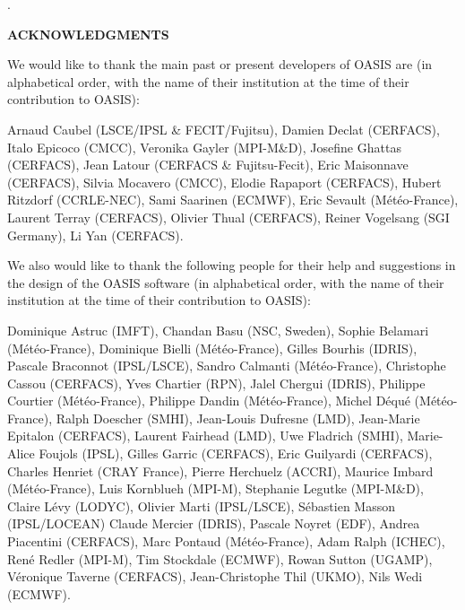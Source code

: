 \newpage
%
.

\vspace{3cm}

{\bf ACKNOWLEDGMENTS}
 
\vspace{1.5cm}
 We would like to thank the main past or present developers of OASIS
are (in alphabetical order, with the name of their institution at the time of their contribution to OASIS):

Arnaud Caubel (LSCE/IPSL \& FECIT/Fujitsu),
Damien Declat (CERFACS),
Italo Epicoco (CMCC),
Veronika Gayler (MPI-M\&D),
Josefine Ghattas (CERFACS),
Jean Latour (CERFACS \& Fujitsu-Fecit),
Eric Maisonnave (CERFACS),
Silvia Mocavero (CMCC),
Elodie Rapaport (CERFACS),
Hubert Ritzdorf (CCRLE-NEC),
Sami Saarinen (ECMWF),
Eric Sevault (M\'et\'eo-France),
Laurent Terray (CERFACS),
Olivier Thual (CERFACS),
Reiner Vogelsang (SGI Germany),
Li Yan (CERFACS).

\vspace{0.5cm}
We also would like to thank the following people for their help
and suggestions in the design of the OASIS software (in alphabetical
order, with the name of their institution at the time of their contribution to OASIS):

Dominique Astruc (IMFT),
Chandan Basu (NSC, Sweden),
Sophie Belamari (M\'et\'eo-France),
Dominique Bielli (M\'et\'eo-France),
Gilles Bourhis (IDRIS),
Pascale Braconnot (IPSL/LSCE),
Sandro Calmanti (M\'et\'eo-France),
Christophe Cassou (CERFACS),
Yves Chartier (RPN),
Jalel Chergui (IDRIS),
Philippe Courtier (M\'et\'eo-France),
Philippe Dandin (M\'et\'eo-France),
Michel D\'equ\'e (M\'et\'eo-France),
Ralph Doescher (SMHI),
Jean-Louis Dufresne (LMD),
Jean-Marie Epitalon (CERFACS),
Laurent Fairhead (LMD),
Uwe Fladrich (SMHI),
Marie-Alice Foujols (IPSL),
Gilles Garric (CERFACS),
Eric Guilyardi (CERFACS),
Charles Henriet (CRAY France),
Pierre Herchuelz (ACCRI),
Maurice Imbard (M\'et\'eo-France),
Luis Kornblueh (MPI-M),
Stephanie Legutke (MPI-M\&D),
Claire L\'evy (LODYC),
Olivier Marti (IPSL/LSCE),
S\'ebastien Masson (IPSL/LOCEAN)
Claude Mercier (IDRIS),
Pascale Noyret (EDF),
Andrea Piacentini (CERFACS),
Marc Pontaud (M\'et\'eo-France),
Adam Ralph (ICHEC),
Ren\'e Redler (MPI-M),
Tim Stockdale (ECMWF),
Rowan Sutton (UGAMP),
V\'eronique Taverne (CERFACS),
Jean-Christophe Thil (UKMO),
Nils Wedi (ECMWF).



